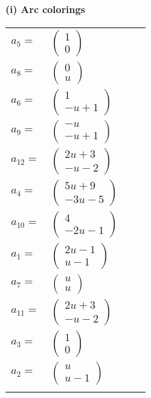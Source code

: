 \documentclass[1p]{elsarticle_modified}
\theoremstyle{definition}
\begin{document}
\flushleft \textbf{(i) Arc colorings}\\
\begin{tabular}{m{7pt} m{180pt} m{7pt} m{180pt} }
\flushright $a_{5}=$&$\begin{pmatrix}1\\0\end{pmatrix}$ \\
\flushright $a_{8}=$&$\begin{pmatrix}0\\u\end{pmatrix}$ \\
\flushright $a_{6}=$&$\begin{pmatrix}1\\- u+1\end{pmatrix}$ \\
\flushright $a_{9}=$&$\begin{pmatrix}- u\\- u+1\end{pmatrix}$ \\
\flushright $a_{12}=$&$\begin{pmatrix}2 u+3\\- u-2\end{pmatrix}$ \\
\flushright $a_{4}=$&$\begin{pmatrix}5 u+9\\-3 u-5\end{pmatrix}$ \\
\flushright $a_{10}=$&$\begin{pmatrix}4\\-2 u-1\end{pmatrix}$ \\
\flushright $a_{1}=$&$\begin{pmatrix}2 u-1\\u-1\end{pmatrix}$ \\
\flushright $a_{7}=$&$\begin{pmatrix}u\\u\end{pmatrix}$ \\
\flushright $a_{11}=$&$\begin{pmatrix}2 u+3\\- u-2\end{pmatrix}$ \\
\flushright $a_{3}=$&$\begin{pmatrix}1\\0\end{pmatrix}$ \\
\flushright $a_{2}=$&$\begin{pmatrix}u\\u-1\end{pmatrix}$\\&\end{tabular}
\end{document}
